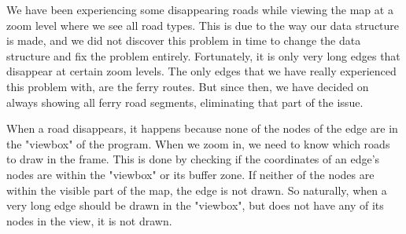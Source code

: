We have been experiencing some disappearing roads while viewing the map at a zoom level where we see all road types. This is due to the way our data structure is made, and we did not discover this problem in time to change the data structure and fix the problem entirely. Fortunately, it is only very long edges that disappear at certain zoom levels. The only edges that we have really experienced this problem with, are the ferry routes. But since then, we have decided on always showing all ferry road segments, eliminating that part of the issue.

When a road disappears, it happens because none of the nodes of the edge are in the "viewbox" of the program. When we zoom in, we need to know which roads to draw in the frame. This is done by checking if the coordinates of an edge's nodes are within the "viewbox" or its buffer zone. If neither of the nodes are within the visible part of the map, the edge is not drawn. So naturally, when a very long edge should be drawn in the "viewbox", but does not have any of its nodes in the view, it is not drawn. 
